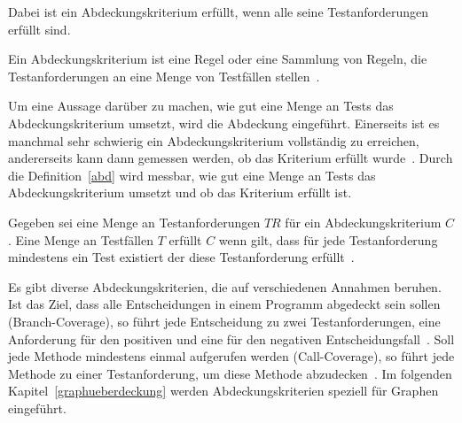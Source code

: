 Dabei ist ein Abdeckungskriterium erfüllt, wenn alle seine Testanforderungen erfüllt sind.

\begin{definition}
    Ein Abdeckungskriterium ist eine Regel oder eine Sammlung von Regeln, die Testanforderungen an eine Menge von Testfällen stellen~\cite[Def. 1.21]{software-testing}.
\end{definition}

Um eine Aussage darüber zu machen, wie gut eine Menge an Tests das Abdeckungskriterium umsetzt, wird die Abdeckung eingeführt.
Einerseits ist es manchmal sehr schwierig ein Abdeckungskriterium vollständig zu erreichen, andererseits kann dann gemessen werden, ob das Kriterium erfüllt wurde~\cite[vgl. S. 18]{software-testing}.
Durch die Definition~\ref{abd} wird messbar, wie gut eine Menge an Tests das Abdeckungskriterium umsetzt und ob das Kriterium erfüllt ist.

\begin{definition}
    Gegeben sei eine Menge an Testanforderungen $TR$ für ein Abdeckungskriterium $C$. 
    Eine Menge an Testfällen $T$ erfüllt $C$ wenn gilt, 
    dass für jede Testanforderung mindestens ein Test existiert der diese Testanforderung erfüllt~\cite[vgl. Def. 1.22]{software-testing}.
    \label{abd}
\end{definition}

Es gibt diverse Abdeckungskriterien, die auf verschiedenen Annahmen beruhen.
Ist das Ziel, dass alle Entscheidungen in einem Programm abgedeckt sein sollen (Branch-Coverage), so führt jede Entscheidung zu zwei
Testanforderungen, eine Anforderung für den positiven und eine für den negativen Entscheidungsfall~\cite[vgl. S. 17]{software-testing}.
Soll jede Methode mindestens einmal aufgerufen werden (Call-Coverage), so führt jede Methode zu einer Testanforderung, um diese Methode abzudecken~\cite[vgl. S. 17]{software-testing}.
Im folgenden Kapitel~\ref{graphueberdeckung} werden Abdeckungskriterien speziell für Graphen eingeführt.